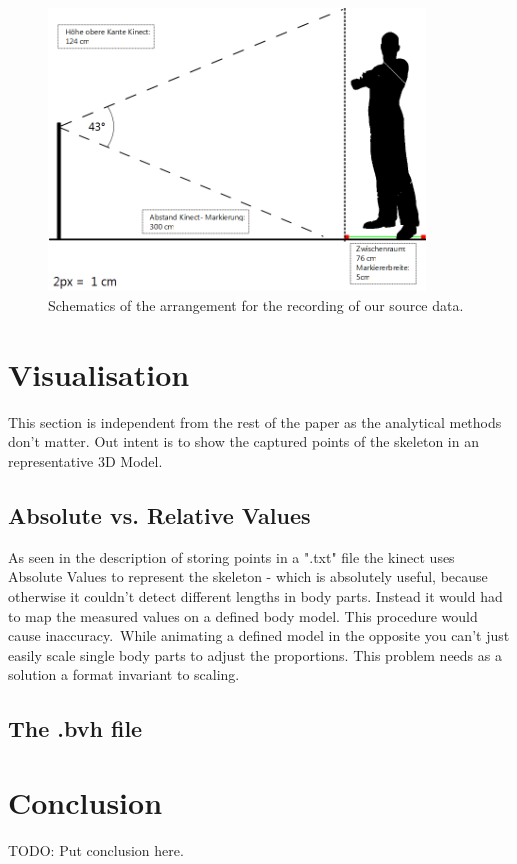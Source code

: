 \documentclass[a4paper]{article}
\begin{document}
\begin{figure}
	\centering
	\includegraphics[width=10cm]{Aufbau.png}
	\caption{Schematics of the arrangement for the recording of our source data.}
	\label{fig:schematic}
\end{figure}

\section{Visualisation}

This section is independent from the rest of the paper as the analytical methods don't matter. Out intent is to show the captured points of the skeleton in an representative 3D Model.

\subsection{Absolute vs. Relative Values}
As seen in the description of storing points in a ".txt" file the kinect uses Absolute Values to represent the skeleton  - which is absolutely useful, because otherwise it couldn't detect different lengths in body parts. Instead it would had to map the measured values on a defined body model. This procedure would cause inaccuracy.\
While animating a defined model in the opposite you can't just easily scale single body parts to adjust the proportions. This problem needs as a solution a format invariant to scaling.

\subsection{The .bvh file}

\section{Conclusion}

TODO: Put conclusion here.

\newpage

\end{document}
